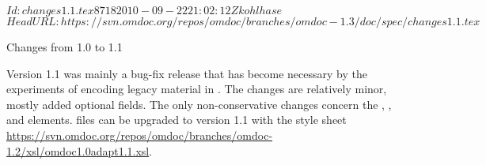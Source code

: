 \svnInfo $Id: changes1.1.tex 8718 2010-09-22 21:02:12Z kohlhase $
\svnKeyword $HeadURL: https://svn.omdoc.org/repos/omdoc/branches/omdoc-1.3/doc/spec/changes1.1.tex $

\begin{tsection}[id=changes1.1]{Changes from 1.0 to 1.1}
  
  Version 1.1 was mainly a bug-fix release that has become necessary by the experiments of
  encoding legacy material in {\omdoc}. The changes are relatively minor, mostly added
  optional fields. The only non-conservative changes concern the {},
  {}, {} and {} elements.
  {\omdoc} files can be upgraded to version 1.1 with the {\xslt} style sheet
  \url{https://svn.omdoc.org/repos/omdoc/branches/omdoc-1.2/xsl/omdoc1.0adapt1.1.xsl}.


\end{tsection}
